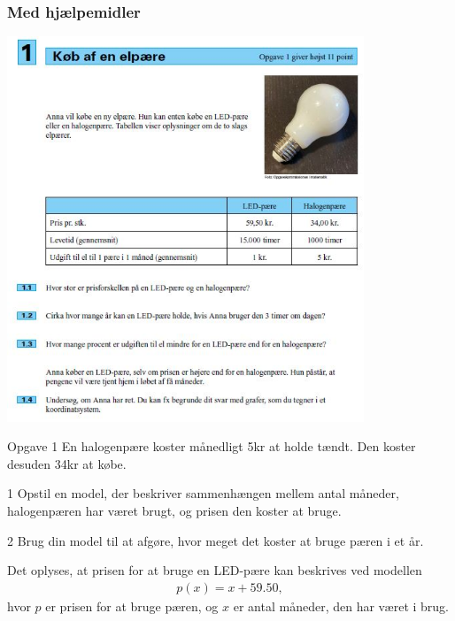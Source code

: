\subsubsection*{Med hjælpemidler}

\begin{center}
	\includegraphics[width = 0.8\textwidth]{Billeder/opg1fskhj}
\end{center}
\begin{opgavetekst}{Opgave 1}
	En halogenpære koster månedligt 5kr at holde tændt. Den koster desuden 34kr at købe. 
\end{opgavetekst}

\begin{delopgave}{}{1}
	Opstil en model, der beskriver sammenhængen mellem antal måneder, halogenpæren har været 
	brugt, og prisen den koster at bruge. 
\end{delopgave}

\begin{delopgave}{}{2}
	Brug din model til at afgøre, hvor meget det koster at bruge pæren i et år.
\end{delopgave}

\begin{meretekst}
	Det oplyses, at prisen for at bruge en LED-pære kan beskrives ved modellen
	\begin{align*}
		p(x) = x + 59.50,
	\end{align*}
	hvor $p$ er prisen for at bruge pæren, og $x$ er antal måneder, den har været i brug.
\end{meretekst}

